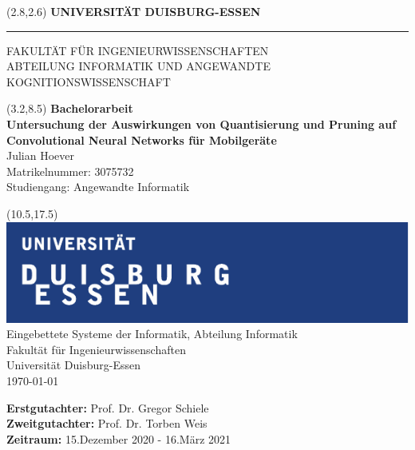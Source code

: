 
\begin{titlepage}
\vspace*{-1cm}
\newlength{\links}
\setlength{\links}{0.9cm}
\setlength{\TPHorizModule}{1cm}
\setlength{\TPVertModule}{1cm}
\textblockorigin{0pt}{0pt}

\sf
\LARGE

\begin{textblock}{16.5}(2.8,2.6)
 \hspace*{-0.25cm} \textbf{UNIVERSITÄT DUISBURG-ESSEN} \\
 \hspace*{-1.15cm} \rule{5mm}{5mm} \hspace*{0.05cm} FAKULTÄT FÜR INGENIEURWISSENSCHAFTEN\\
 \large{}ABTEILUNG INFORMATIK UND ANGEWANDTE KOGNITIONSWISSENSCHAFT\\
\end{textblock}


\begin{textblock}{14.5}(3.2,8.5)
  \large
{ \bf Bachelorarbeit} \\[1cm]
{\LARGE \Large\bf Untersuchung der Auswirkungen von Quantisierung und Pruning auf Convolutional Neural Networks für Mobilgeräte} \\[1.3cm]
Julian Hoever\\
Matrikelnummer: 3075732\\
Studiengang: Angewandte Informatik
\end{textblock}



\begin{textblock}{10}(10.5,17.5)
\includegraphics[scale=1.0]{content/images/unilogo.pdf}\\
\normalsize
\raggedleft
Eingebettete Systeme der Informatik, Abteilung Informatik \\
Fakultät für Ingenieurwissenschaften \\
Universität Duisburg-Essen \\[2ex]

\today\\[15ex]
\raggedright
{\bf Erstgutachter:} Prof. Dr. Gregor Schiele \\
{\bf Zweitgutachter:} Prof. Dr. Torben Weis \\
{\bf Zeitraum:} 15.Dezember 2020 - 16.März 2021\\
\end{textblock}

\end{titlepage}
